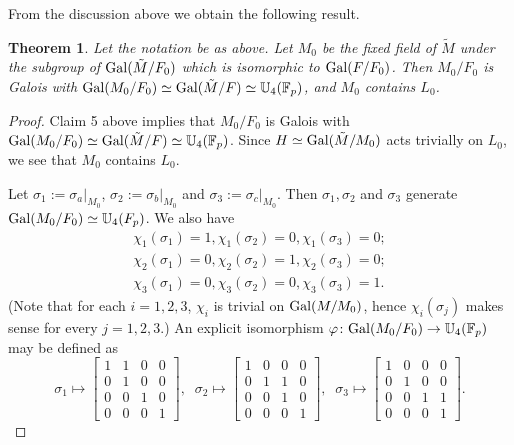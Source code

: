 \documentclass[12pt,leqno]{amsart}
\theoremstyle{plain}
\newtheorem{thm}{Theorem}[section]
\theoremstyle{definition}
\newcommand{\F}{{\mathbb F}}
\newcommand{\U}{{\mathbb U}}
\begin{document}
From the discussion above we obtain  the following result.
\begin{thm}
\label{thm:construction char not p} 
Let the notation be as above. 
Let $M_0$ be the fixed field of $\tilde{M}$ under the subgroup of ${\rm Gal}(\tilde{M}/F_0)$ which is isomorphic to ${\rm Gal}(F/F_0)$. 
Then $M_0/F_0$ is Galois with 
${\rm Gal}(M_0/F_0)\simeq {\rm Gal}(\tilde{M}/F)\simeq \U_4(\F_p)$, and $M_0$ contains $L_0$.
\end{thm}
\begin{proof} Claim 5 above implies that $M_0/F_0$ is Galois with 
${\rm Gal}(M_0/F_0)\simeq {\rm Gal}(\tilde{M}/F)\simeq \U_4(\F_p)$. Since $H\simeq {\rm Gal}(\tilde{M}/M_0)$ acts trivially on $L_0$, we see that $M_0$ contains $L_0$.

Let $\sigma_1:=\sigma_a|_{M_0}$, $\sigma_2:=\sigma_b|_{M_0}$ and $\sigma_3:=\sigma_c|_{M_0}$. 
  Then $\sigma_1,\sigma_2$ and $\sigma_3$ generate ${\rm Gal}(M_0/F_0)\simeq \U_4(F_p)$. We also have
  \[
  \begin{aligned}
  \chi_1(\sigma_1)=1,   \chi_1(\sigma_2)=0,   \chi_1(\sigma_3)=0;\\
  \chi_2(\sigma_1)=0,   \chi_2(\sigma_2)=1,   \chi_2(\sigma_3)=0;\\
  \chi_3(\sigma_1)=0,   \chi_3(\sigma_2)=0,   \chi_3(\sigma_3)=1.
  \end{aligned}
  \]
  (Note that for each $i=1,2,3$, $\chi_i$ is trivial on ${\rm Gal}(M/M_0)$, hence $\chi_i(\sigma_j)$ makes sense for every $j=1,2,3$.)
  An explicit isomorphism $\varphi\colon {\rm Gal}(M_0/F_0)\to \U_4(\F_p)$ may be defined as
\[
\sigma_1 \mapsto \begin{bmatrix}
1& 1 & 0 & 0\\
0& 1 & 0 & 0\\
0& 0 & 1 & 0\\
0& 0 & 0 & 1
\end{bmatrix}, \; \;
\sigma_2\mapsto  \begin{bmatrix}
1& 0 & 0 & 0\\
0& 1 & 1 & 0\\
0& 0 & 1 & 0\\
0& 0 & 0 & 1
\end{bmatrix}, \;\;
 \sigma_3\mapsto \begin{bmatrix}
1& 0 & 0 & 0\\
0& 1 & 0 & 0\\
0& 0 & 1 & 1\\
0& 0 & 0 & 1
\end{bmatrix}.
\]

\end{proof}
\end{document}
